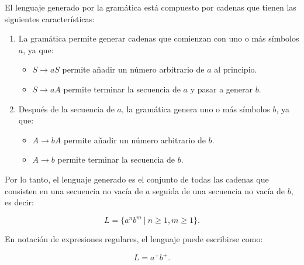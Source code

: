 \documentclass[12pt]{book} %
\begin{document}
\begin{enumerate}
  \begin{solucion}[Ejercicio 2.c]

   El lenguaje generado por la gramática está compuesto por cadenas que tienen las siguientes características:

   \begin{enumerate}
       \item La gramática permite generar cadenas que comienzan con uno o más símbolos $a$, ya que:
           \begin{itemize}
               \item $S \to aS$ permite añadir un número arbitrario de $a$ al principio.
               \item $S \to aA$ permite terminar la secuencia de $a$ y pasar a generar $b$.
           \end{itemize}
       \item Después de la secuencia de $a$, la gramática genera uno o más símbolos $b$, ya que:
           \begin{itemize}
               \item $A \to bA$ permite añadir un número arbitrario de $b$.
               \item $A \to b$ permite terminar la secuencia de $b$.
           \end{itemize}
   \end{enumerate}

   Por lo tanto, el lenguaje generado es el conjunto de todas las cadenas que consisten en una secuencia no vacía de $a$ seguida de una secuencia no vacía de $b$, es decir:

   $$
   L = \{ a^n b^m \ | \ n \geq 1, m \geq 1 \}.
   $$

   En notación de expresiones regulares, el lenguaje puede escribirse como:

   $$
   L = a^+b^+.
   $$

   \end{solucion}
\end{enumerate}
\end{document}
